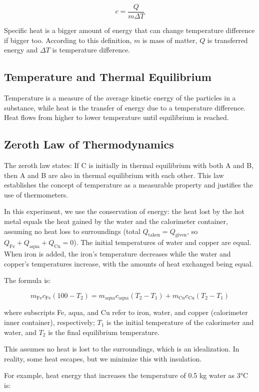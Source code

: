 \documentclass[12pt, a4paper]{article}
\begin{document}
\[ c = \frac{Q}{m \Delta T} \]

Specific heat is a bigger amount of energy that can change temperature difference if bigger too. According to this definition, $m$ is mass of matter, $Q$ is transferred energy and $\Delta T$ is temperature difference.

\subsection{Temperature and Thermal Equilibrium}
Temperature is a measure of the average kinetic energy of the particles in a substance, while heat is the transfer of energy due to a temperature difference. Heat flows from higher to lower temperature until equilibrium is reached.

\subsection{Zeroth Law of Thermodynamics}
The zeroth law states: If C is initially in thermal equilibrium with both A and B, then A and B are also in thermal equilibrium with each other. This law establishes the concept of temperature as a measurable property and justifies the use of thermometers.

In this experiment, we use the conservation of energy: the heat lost by the hot metal equals the heat gained by the water and the calorimeter container, assuming no heat loss to surroundings (total $Q_{\text{taken}} = Q_{\text{given}}$, so $Q_{\text{Fe}} + Q_{\text{aqua}} + Q_{\text{Cu}} = 0$). The initial temperatures of water and copper are equal. When iron is added, the iron's temperature decreases while the water and copper's temperatures increase, with the amounts of heat exchanged being equal.

The formula is:

\[ m_{\text{Fe}} c_{\text{Fe}} (100 - T_2) = m_{\text{aqua}} c_{\text{aqua}} (T_2 - T_1) + m_{\text{Cu}} c_{\text{Cu}} (T_2 - T_1) \]

where subscripts Fe, aqua, and Cu refer to iron, water, and copper (calorimeter inner container), respectively; $T_1$ is the initial temperature of the calorimeter and water, and $T_2$ is the final equilibrium temperature.

This assumes no heat is lost to the surroundings, which is an idealization. In reality, some heat escapes, but we minimize this with insulation.

For example, heat energy that increases the temperature of 0.5 kg water as 3°C is:
\end{document}
